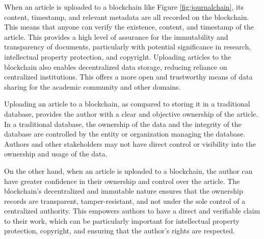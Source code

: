 \documentclass[lettersize,journal]{IEEEtran}
\begin{document}
When an article is uploaded to a blockchain like Figure \ref{fig:journalchain}, its content, timestamp, and relevant metadata are all recorded on the blockchain. This means that anyone can verify the existence, content, and timestamp of the article. This provides a high level of assurance for the immutability and transparency of documents, particularly with potential significance in research, intellectual property protection, and copyright. Uploading articles to the blockchain also enables decentralized data storage, reducing reliance on centralized institutions. This offers a more open and trustworthy means of data sharing for the academic community and other domains.


Uploading an article to a blockchain, as compared to storing it in a traditional database, provides the author with a clear and objective ownership of the article. In a traditional database, the ownership of the data and the integrity of the database are controlled by the entity or organization managing the database. Authors and other stakeholders may not have direct control or visibility into the ownership and usage of the data.

On the other hand, when an article is uploaded to a blockchain, the author can have greater confidence in their ownership and control over the article. The blockchain's decentralized and immutable nature ensures that the ownership records are transparent, tamper-resistant, and not under the sole control of a centralized authority. This empowers authors to have a direct and verifiable claim to their work, which can be particularly important for intellectual property protection, copyright, and ensuring that the author's rights are respected.
\end{document}
